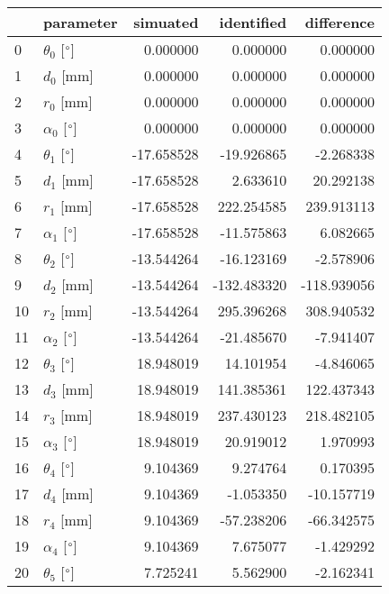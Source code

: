 \documentclass{standalone}%
\begin{document}
%
\normalsize%
\begin{tabular}{llrrr}
\toprule
{} &                 parameter &   simuated &  identified &  difference \\
\midrule
0  &  $\theta_{0}$ [$\degree$] &   0.000000 &    0.000000 &    0.000000 \\
1  &              $d_{0}$ [mm] &   0.000000 &    0.000000 &    0.000000 \\
2  &              $r_{0}$ [mm] &   0.000000 &    0.000000 &    0.000000 \\
3  &  $\alpha_{0}$ [$\degree$] &   0.000000 &    0.000000 &    0.000000 \\
4  &  $\theta_{1}$ [$\degree$] & -17.658528 &  -19.926865 &   -2.268338 \\
5  &              $d_{1}$ [mm] & -17.658528 &    2.633610 &   20.292138 \\
6  &              $r_{1}$ [mm] & -17.658528 &  222.254585 &  239.913113 \\
7  &  $\alpha_{1}$ [$\degree$] & -17.658528 &  -11.575863 &    6.082665 \\
8  &  $\theta_{2}$ [$\degree$] & -13.544264 &  -16.123169 &   -2.578906 \\
9  &              $d_{2}$ [mm] & -13.544264 & -132.483320 & -118.939056 \\
10 &              $r_{2}$ [mm] & -13.544264 &  295.396268 &  308.940532 \\
11 &  $\alpha_{2}$ [$\degree$] & -13.544264 &  -21.485670 &   -7.941407 \\
12 &  $\theta_{3}$ [$\degree$] &  18.948019 &   14.101954 &   -4.846065 \\
13 &              $d_{3}$ [mm] &  18.948019 &  141.385361 &  122.437343 \\
14 &              $r_{3}$ [mm] &  18.948019 &  237.430123 &  218.482105 \\
15 &  $\alpha_{3}$ [$\degree$] &  18.948019 &   20.919012 &    1.970993 \\
16 &  $\theta_{4}$ [$\degree$] &   9.104369 &    9.274764 &    0.170395 \\
17 &              $d_{4}$ [mm] &   9.104369 &   -1.053350 &  -10.157719 \\
18 &              $r_{4}$ [mm] &   9.104369 &  -57.238206 &  -66.342575 \\
19 &  $\alpha_{4}$ [$\degree$] &   9.104369 &    7.675077 &   -1.429292 \\
20 &  $\theta_{5}$ [$\degree$] &   7.725241 &    5.562900 &   -2.162341 \\

\end{tabular}
\end{document}
